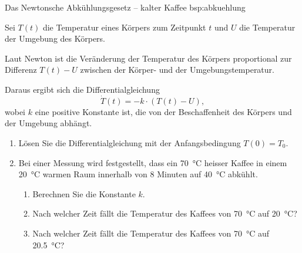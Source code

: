 \begin{bsp}{Das Newtonsche Abkühlungsgesetz -- kalter Kaffee}
    {bsp:abkuehlung}

    Sei \(T(t)\) die Temperatur eines Körpers zum Zeitpunkt
    \(t\) und \(U\) die Temperatur der Umgebung des Körpers.

    Laut Newton ist die Veränderung der Temperatur des Körpers
    proportional zur Differenz \(T(t)-U\) zwischen der Körper-
    und der Umgebungstemperatur.

    Daraus ergibt sich die Differentialgleichung
    \[
        \dot{T}(t)=-k\cdot(T(t)-U),
    \]
    wobei \(k\) eine positive Konstante ist, die von der
    Beschaffenheit des Körpers und der Umgebung abhängt.

    \begin{enumerate}
        \item Lösen Sie die Differentialgleichung mit der
              Anfangsbedingung \(T(0)=T_0\).

        \item Bei einer Messung wird festgestellt, dass ein
              \qty{70}{\degreeCelsius} heisser Kaffee in einem
              \qty{20}{\degreeCelsius} warmen Raum innerhalb
              von 8 Minuten auf \qty{40}{\degreeCelsius}
              abkühlt.

              \begin{enumerate}[label=\alph*)]
                  \item Berechnen Sie die Konstante \(k\).

                  \item Nach welcher Zeit fällt die Temperatur
                        des Kaffees von \qty{70}{\degreeCelsius}
                        auf \qty{20}{\degreeCelsius}?

                  \item Nach welcher Zeit fällt die Temperatur
                        des Kaffees von \qty{70}{\degreeCelsius}
                        auf \qty{20.5}{\degreeCelsius}?
              \end{enumerate}
    \end{enumerate}
    \pagebreak
\end{bsp}

\pagebreak



